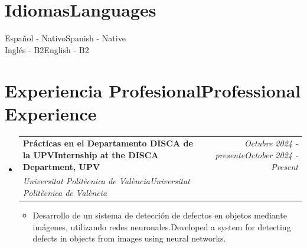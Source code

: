 \documentclass[11pt,a4paper]{article}
\makeatletter
\newcommand{\resumeProject}[4]{
\vspace{0.5mm}\item
    \begin{tabular*}{0.98\textwidth}[t]{l@{\extracolsep{\fill}}r}
        \textbf{#1} & \textit{\footnotesize{#3}} \\
        \footnotesize{\textit{#2}} & \footnotesize{#4}
    \end{tabular*}
    \vspace{-2.4mm}
}
\newcommand{\resumeSubHeadingListStart}{\begin{itemize}[leftmargin=*,labelsep=0mm]}
\newcommand{\resumeItemListStart}{\begin{justify}\begin{itemize}[leftmargin=3ex, rightmargin=2ex, noitemsep,labelsep=1.2mm,itemsep=0mm]\small}
\newcommand{\resumeSubHeadingListEnd}{\end{itemize}\vspace{2mm}}
\newcommand{\resumeItemListEnd}{\end{itemize}\end{justify}\vspace{-2mm}}
\makeatother
\begin{document}
\section{\textbf{\ifdefined\spanish Idiomas\else Languages\fi}}
\begin{itemize}[leftmargin=0.1in, label={}]
    \small{\item{
     \ifdefined\spanish Español - Nativo\else Spanish - Native\fi \\
     \ifdefined\spanish Inglés - B2\else English - B2\fi
    }}
 \end{itemize}
 \vspace{-16pt}


\section{\textbf{\ifdefined\spanish Experiencia Profesional\else Professional Experience\fi}}
  \resumeSubHeadingListStart
    \resumeProject
      {\ifdefined\spanish Prácticas en el Departamento DISCA de la UPV\else Internship at the DISCA Department, UPV\fi}
      {\ifdefined\spanish Universitat Politècnica de València\else Universitat Politècnica de València\fi}
      {\ifdefined\spanish Octubre 2024 - presente\else October 2024 - Present\fi}
      {}
    \resumeItemListStart
        \item {\ifdefined\spanish Desarrollo de un sistema de detección de defectos en objetos mediante imágenes, utilizando redes neuronales.\else Developed a system for detecting defects in objects from images using neural networks.\fi}
    \resumeItemListEnd
  \resumeSubHeadingListEnd
\end{document}

